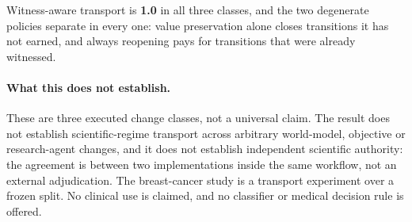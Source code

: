 Witness-aware transport is \textbf{1.0} in all three classes, and the two
degenerate policies separate in every one: value preservation alone closes
transitions it has not earned, and always reopening pays for transitions that
were already witnessed.

\paragraph{What this does not establish.} These are three executed change
classes, not a universal claim. The result does not establish scientific-regime
transport across arbitrary world-model, objective or research-agent changes, and
it does not establish independent scientific authority: the agreement is between
two implementations inside the same workflow, not an external adjudication. The
breast-cancer study is a transport experiment over a frozen split. No clinical
use is claimed, and no classifier or medical decision rule is offered.
